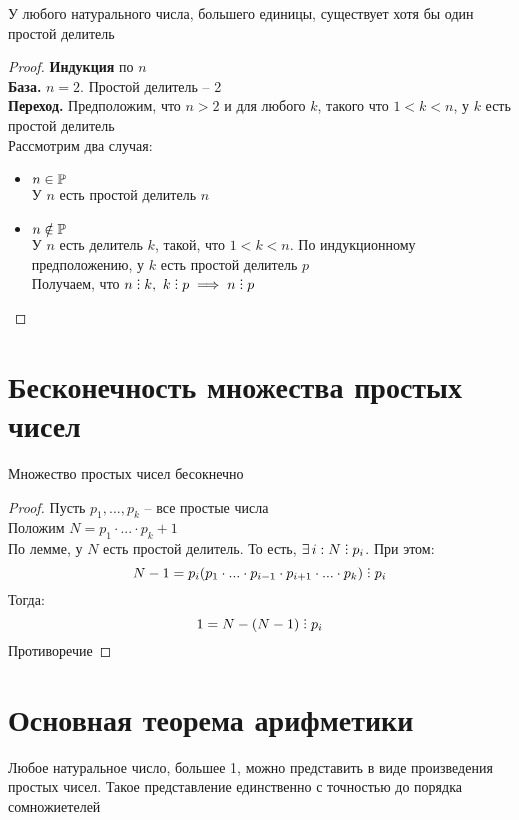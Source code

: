 \begin{lemma}
	У любого натурального числа, большего единицы, существует хотя бы один простой делитель
\end{lemma}

\begin{proof}
	\textbf{Индукция} по $n$ \\
	\textbf{База.} $n = 2$. Простой делитель -- 2 \\
	\textbf{Переход. } Предположим, что $n > 2$ и для любого $k$, такого что $1 < k < n$, у $k$ есть простой делитель \\
	Рассмотрим два случая:
	\begin{itemize}
		\item $n \in \mathbb{P}$ \\
		У $n$ есть простой делитель $n$
		\item $n \notin \mathbb{P}$ \\
		У $n$ есть делитель $k$, такой, что $1 < k < n$. По индукционному предположению, у $k$ есть простой делитель $p$ \\
		Получаем, что $n \divby k, ~ k \divby p \implies n \divby p $
	\end{itemize}
\end{proof}

\section{Бесконечность множества простых чисел}

\begin{theorem}[Евклида]
	Множество простых чисел бесокнечно
\end{theorem}

\begin{proof}
	Пусть $p_1, ..., p_k$ -- все простые числа \\
	Положим $N = p_1 \cdot ... \cdot p_k + 1$ \\
	По лемме, у $N$ есть простой делитель. То есть, $ \exist i : N \divby p_i$. При этом:
	$$ N - 1 = p_i(p_1 \cdot ... \cdot p_{i - 1} \cdot p_{i + 1} \cdot ... \cdot p_k) \divby p_i $$
	Тогда:
	$$ 1 = N - (N - 1) \divby p_i $$
	Противоречие
\end{proof}

\section{Основная теорема арифметики}

\begin{theorem}
	Любое натуральное число, большее 1, можно представить в виде произведения простых чисел. Такое представление единственно с точностью до порядка сомножиетелей
\end{theorem}

